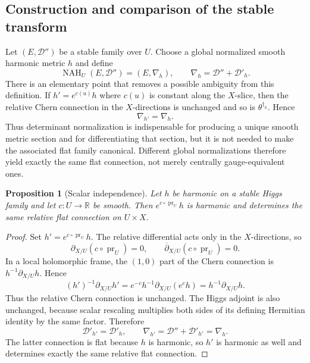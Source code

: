 \documentclass[11pt,reqno]{amsart}
\newtheorem{proposition}[theorem]{Proposition}
\theoremstyle{definition}
\theoremstyle{remark}
\newcommand{\R}{\mathbb R}
\newcommand{\cD}{\mathcal D}
\newcommand{\ddbar}{\overline\partial}
\begin{document}
\subsection{Construction and comparison of the stable transform}

Let $(E,\cD'')$ be a stable family over $U$.  Choose a global normalized smooth harmonic metric $h$ and define
\begin{equation}\label{eq:NAH-family-transform}
  \operatorname{NAH}_U(E,\cD'')=(E,\nabla_h),
  \qquad
  \nabla_h=\cD''+\cD'_h.
\end{equation}
There is an elementary point that removes a possible ambiguity from this definition.  If $h'=e^{c(u)}h$ where $c(u)$ is constant along the $X$-slice, then the relative Chern connection in the $X$-directions is unchanged and so is $\theta^{\dagger_h}$.  Hence
\begin{equation}\label{eq:scalar-independence-flat}
  \nabla_{h'}=\nabla_h.
\end{equation}
Thus determinant normalization is indispensable for producing a unique smooth metric section and for differentiating that section, but it is not needed to make the associated flat family canonical.  Different global normalizations therefore yield exactly the same flat connection, not merely centrally gauge-equivalent ones.

\begin{proposition}[Scalar independence]\label{prop:scalar-independence}
Let $h$ be harmonic on a stable Higgs family and let $c:U\to\R$ be smooth.  Then $e^{c\circ\operatorname{pr}_U}h$ is harmonic and determines the same relative flat connection on $U\times X$.
\end{proposition}

\begin{proof}
Set $h'=e^{c\circ\operatorname{pr}_U}h$.  The relative differential acts only in the $X$-directions, so
\[
  \partial_{X/U}(c\circ\operatorname{pr}_U)=0,
  \qquad
  \ddbar_{X/U}(c\circ\operatorname{pr}_U)=0.
\]
In a local holomorphic frame, the $(1,0)$ part of the Chern connection is $h^{-1}\partial_{X/U}h$.  Hence
\[
  (h')^{-1}\partial_{X/U}h'
  =e^{-c}h^{-1}\partial_{X/U}(e^ch)
  =h^{-1}\partial_{X/U}h.
\]
Thus the relative Chern connection is unchanged.  The Higgs adjoint is also unchanged, because scalar rescaling multiplies both sides of its defining Hermitian identity by the same factor.  Therefore
\[
  \cD'_{h'}=\cD'_h,
  \qquad
  \nabla_{h'}=\cD''+\cD'_{h'}=\nabla_h.
\]
The latter connection is flat because $h$ is harmonic, so $h'$ is harmonic as well and determines exactly the same relative flat connection.
\end{proof}
\end{document}
